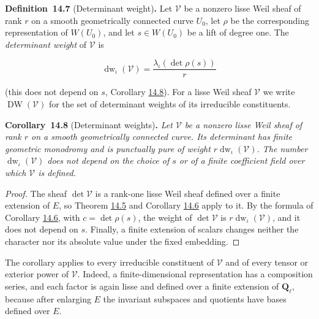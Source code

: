 \documentclass[11pt]{article}
\newenvironment{bpstatement}[2]{\par\addvspace{0.6\baselineskip}\noindent\textbf{#1}#2\textbf{.}\enspace\ignorespaces}
  {\par\addvspace{0.4\baselineskip}}
\newenvironment{bpstatementit}[2]{\begin{bpstatement}{#1}{#2}\itshape\ignorespaces}{\end{bpstatement}}
\begin{document}
\label{bp26}%
\begin{bpstatement}{Definition~14.7}{ (Determinant weight)}
Let \(\mathcal V\) be a nonzero lisse Weil sheaf of rank \(r\) on a smooth geometrically connected curve \(U_0\), let \(\rho\) be the corresponding representation of \(W(U_0)\), and let \(s\in W(U_0)\) be a lift of degree one. The \emph{determinant weight} of \(\mathcal V\) is

\[
\operatorname{dw}_\iota(\mathcal V)
=\frac{\lambda_\iota(\det\rho(s))}{r}
\]

(this does not depend on \(s\), Corollary \hyperref[bp27]{14.8}). For a lisse Weil sheaf \(\mathcal V\) we write \(\operatorname{DW}(\mathcal V)\) for the set of determinant weights of its irreducible constituents.
\end{bpstatement}

\label{bp27}%
\begin{bpstatementit}{Corollary~14.8}{ (Determinant weights)}
Let \(\mathcal V\) be a nonzero lisse Weil sheaf of rank \(r\) on a smooth geometrically connected curve.  Its determinant has finite geometric monodromy and is punctually pure of weight \(r\operatorname{dw}_\iota(\mathcal V)\). The number \(\operatorname{dw}_\iota(\mathcal V)\) does not depend on the choice of \(s\) or of a finite coefficient field over which \(\mathcal V\) is defined.
\end{bpstatementit}

\begin{proof}[{Proof}]\label{bp28}%
The sheaf \(\det\mathcal V\) is a rank-one lisse Weil sheaf defined over a finite extension of \(E\), so Theorem \hyperref[bp20]{14.5} and Corollary \hyperref[bp23]{14.6} apply to it.  By the formula of Corollary \hyperref[bp23]{14.6}, with \(c=\det\rho(s)\), the weight of \(\det\mathcal V\) is \(r\operatorname{dw}_\iota(\mathcal V)\), and it does not depend on \(s\). Finally, a finite extension of scalars changes neither the character nor its absolute value under the fixed embedding.
\end{proof}

\label{bp29}%
The corollary applies to every irreducible constituent of \(\mathcal V\) and of every tensor or exterior power of \(\mathcal V\). Indeed, a finite-dimensional representation has a composition series, and each factor is again lisse and defined over a finite extension of \(\mathbf Q_\ell\), because after enlarging \(E\) the invariant subspaces and quotients have bases defined over \(E\).
\end{document}
